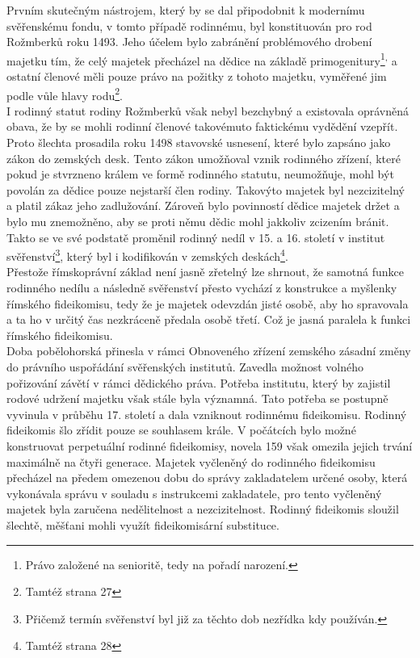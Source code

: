 \documentclass{article}
\begin{document}
Prvním skutečným nástrojem, který by se dal připodobnit k modernímu svěřenskému fondu, v tomto případě rodinnému, byl konstituován pro rod Rožmberků roku 1493. Jeho účelem bylo zabránění problémového drobení majetku tím, že celý majetek přecházel na dědice na základě primogenitury\footnote{Právo založené na senioritě, tedy na pořadí narození.}\textsuperscript{,} a ostatní členové měli pouze právo na požitky z tohoto majetku, vyměřené jim podle vůle hlavy rodu\footnote{Tamtéž strana 27}.\\

I rodinný statut rodiny Rožmberků však nebyl bezchybný a existovala oprávněná obava, že by se mohli rodinní členové takovémuto faktickému vydědění vzepřít. Proto šlechta prosadila roku 1498 stavovské usnesení, které bylo zapsáno jako zákon do zemských desk. Tento zákon umožňoval vznik rodinného zřízení, které pokud je stvrzneno králem ve formě rodinného statutu, neumožňuje, mohl být povolán za dědice pouze nejstarší člen rodiny. Takovýto majetek byl nezcizitelný a platil zákaz jeho zadlužování. Zároveň bylo povinností dědice majetek držet a bylo mu znemožněno, aby se proti němu dědic mohl jakkoliv zcizením bránit. Takto se ve své podstatě proměnil rodinný nedíl v 15. a 16. století v institut svěřenství\footnote{Přičemž termín svěřenství byl již za těchto dob nezřídka kdy používán.}, který byl i kodifikován v zemských deskách\footnote{Tamtéž strana 28}.\\ 

Přestože římskoprávní základ není jasně zřetelný lze shrnout, že samotná funkce rodinného nedílu a následně svěřenství přesto vychází z konstrukce a myšlenky římského fideikomisu, tedy že je majetek odevzdán jisté osobě, aby ho spravovala a ta ho v určitý čas nezkráceně předala osobě třetí. Což je jasná paralela k funkci římského fideikomisu.\\

Doba pobělohorská přinesla v rámci Obnoveného zřízení zemského zásadní změny do právního uspořádání svěřenských institutů. Zavedla možnost volného pořizování závětí v rámci dědického práva. Potřeba institutu, který by zajistil rodové udržení majetku však stále byla významná. Tato potřeba se postupně vyvinula v průběhu 17. století a dala vzniknout rodinnému fideikomisu. Rodinný fideikomis šlo zřídit pouze se souhlasem krále. V počátcích bylo možné konstruovat perpetuální rodinné fideikomisy, novela 159 však omezila jejich trvání maximálně na čtyři generace. Majetek vyčleněný do rodinného fideikomisu přecházel na předem omezenou dobu do správy zakladatelem určené osoby, která vykonávala správu v souladu s instrukcemi zakladatele, pro tento vyčleněný majetek byla zaručena nedělitelnost a nezcizitelnost. Rodinný fideikomis sloužil šlechtě, měšťani mohli využít fideikomisární substituce.\\
\end{document}
